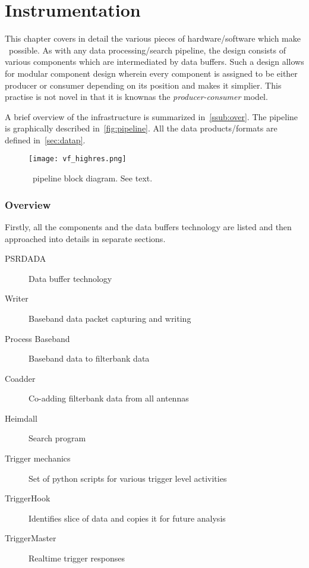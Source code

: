 \chapter{Instrumentation}
\label{ch:inst}

\par This chapter covers in detail the various pieces of hardware/software which make \vf~possible. 
As with any data processing/search pipeline, the design consists of various components which are intermediated by data buffers. 
Such a design allows for modular component design wherein every component is assigned to be either producer or consumer depending on its position and makes it simplier. This practise is not novel in that it is knownas the \emph{producer-consumer} model.

\par A brief overview of the infrastructure is summarized in~\autoref{ssub:over}. 
The pipeline is graphically described in~\autoref{fig:pipeline}. All the data products/formats are defined in~\autoref{sec:datap}.


\begin{figure}[ht]
	\label{fig:pipeline}
	\centering
	\texttt{[image: vf\_highres.png]}
	\caption{\vf~pipeline block diagram. See text.}
\end{figure}

\subsection {Overview}
\label{ssub:over}

\par Firstly, all the components and the data buffers technology are listed and then approached into details in separate sections.
\begin{description}
\item[PSRDADA] Data buffer technology
\item[Writer]  Baseband data packet capturing and writing
\item[Process Baseband] Baseband data to filterbank data
\item[Coadder] Co-adding filterbank data from all antennas
\item[Heimdall] Search program 
\item[Trigger mechanics] Set of python scripts for various trigger level activities
\item[TriggerHook]   Identifies slice of data and copies it for future analysis
\item[TriggerMaster] Realtime trigger responses
\end{description}

